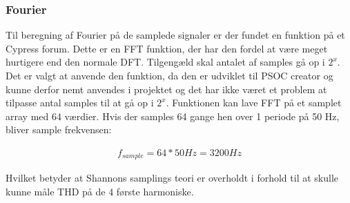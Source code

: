 
\subsubsection{Fourier}

Til beregning af Fourier på de samplede signaler er der fundet en funktion på et Cypress forum\cite{FFTalgo}. Dette er en FFT funktion, der har den fordel at være meget hurtigere end den normale DFT. Tilgengæld skal antalet af samples gå op i $2^{x}$. Det er valgt at anvende den funktion, da den er udviklet til PSOC creator og kunne derfor nemt anvendes i projektet og det har ikke været et problem at tilpasse antal samples til at gå op i $2^{x}$. Funktionen kan lave FFT på et samplet array med 64 værdier. Hvis der samples 64 gange hen over 1 periode på 50 Hz, bliver sample frekvensen:

\begin{align}
f_{sample} = 64 * 50Hz = 3200Hz
\end{align}

Hvilket betyder at Shannons samplings teori er overholdt i forhold til at skulle kunne måle THD på de 4 første harmoniske.    